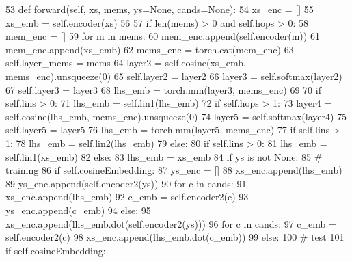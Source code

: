 \begin{DoxyCode}
53     \textcolor{keyword}{def }forward(self, xs, mems, ys=None, cands=None):
54         xs\_enc = []
55         xs\_emb = self.encoder(xs)
56 
57         \textcolor{keywordflow}{if} len(mems) > 0 \textcolor{keywordflow}{and} self.hops > 0:
58             mem\_enc = []
59             \textcolor{keywordflow}{for} m \textcolor{keywordflow}{in} mems:
60                 mem\_enc.append(self.encoder(m))
61             mem\_enc.append(xs\_emb)
62             mems\_enc = torch.cat(mem\_enc)
63             self.layer\_mems = mems
64             layer2 = self.cosine(xs\_emb, mems\_enc).unsqueeze(0)
65             self.layer2 = layer2
66             layer3 = self.softmax(layer2)
67             self.layer3 = layer3
68             lhs\_emb = torch.mm(layer3, mems\_enc)
69 
70             \textcolor{keywordflow}{if} self.lins > 0:
71                 lhs\_emb = self.lin1(lhs\_emb)
72             \textcolor{keywordflow}{if} self.hops > 1:
73                 layer4 = self.cosine(lhs\_emb, mems\_enc).unsqueeze(0)
74                 layer5 = self.softmax(layer4)
75                 self.layer5 = layer5
76                 lhs\_emb = torch.mm(layer5, mems\_enc)
77                 \textcolor{keywordflow}{if} self.lins > 1:
78                     lhs\_emb = self.lin2(lhs\_emb)
79         \textcolor{keywordflow}{else}:
80             \textcolor{keywordflow}{if} self.lins > 0:
81                 lhs\_emb = self.lin1(xs\_emb)
82             \textcolor{keywordflow}{else}:
83                 lhs\_emb = xs\_emb
84         \textcolor{keywordflow}{if} ys \textcolor{keywordflow}{is} \textcolor{keywordflow}{not} \textcolor{keywordtype}{None}:
85             \textcolor{comment}{# training}
86             \textcolor{keywordflow}{if} self.cosineEmbedding:
87                 ys\_enc = []
88                 xs\_enc.append(lhs\_emb)
89                 ys\_enc.append(self.encoder2(ys))
90                 \textcolor{keywordflow}{for} c \textcolor{keywordflow}{in} cands:
91                     xs\_enc.append(lhs\_emb)
92                     c\_emb = self.encoder2(c)
93                     ys\_enc.append(c\_emb)
94             \textcolor{keywordflow}{else}:
95                 xs\_enc.append(lhs\_emb.dot(self.encoder2(ys)))
96                 \textcolor{keywordflow}{for} c \textcolor{keywordflow}{in} cands:
97                     c\_emb = self.encoder2(c)
98                     xs\_enc.append(lhs\_emb.dot(c\_emb))
99         \textcolor{keywordflow}{else}:
100             \textcolor{comment}{# test}
101             \textcolor{keywordflow}{if} self.cosineEmbedding:

\end{DoxyCode}
